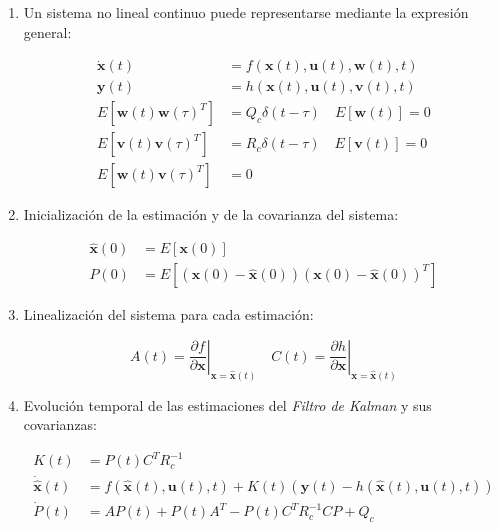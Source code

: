 \begin{enumerate}

\item Un sistema no lineal continuo puede representarse mediante la expresión general:

\begin{equation}
\begin{split}
	\boldsymbol{\dot{x}}(t) &= f(\boldsymbol{x}(t),\boldsymbol{u}(t),\boldsymbol{w}(t),t) \\
	\boldsymbol{y}(t) &= h(\boldsymbol{x}(t),\boldsymbol{u}(t),\boldsymbol{v}(t),t) \\
	E[\boldsymbol{w}(t)\boldsymbol{w}(\tau)^T] &= Q_c \delta(t-\tau) \quad E[\boldsymbol{w}(t)] = 0 \\
	E[\boldsymbol{v}(t)\boldsymbol{v}(\tau)^T] &= R_c \delta(t-\tau) \quad E[\boldsymbol{v}(t)] = 0 \\
	E[\boldsymbol{w}(t)\boldsymbol{v}(\tau)^T] &= 0
\end{split}
\end{equation}

\item Inicialización de la estimación y de la covarianza del sistema: 

\begin{equation}
\begin{split}
	\boldsymbol{\hat{x}}(0) &= E[\boldsymbol{x}(0)] \\
	P(0) &= E[(\boldsymbol{x}(0) - \boldsymbol{\hat{x}}(0)) (\boldsymbol{x}(0) - \boldsymbol{\hat{x}}(0))^T]
\end{split}
\end{equation}

\item Linealización del sistema para cada estimación:

\begin{equation}
	A(t) = \left.\frac{\partial f}{\partial\boldsymbol{x}} \right|_{\boldsymbol{x} = \boldsymbol{\hat{x}}(t)} \quad
	C(t) = \left.\frac{\partial h}{\partial\boldsymbol{x}} \right|_{\boldsymbol{x} = \boldsymbol{\hat{x}}(t)}
\end{equation}

\item Evolución temporal de las estimaciones del \emph{Filtro de Kalman} y sus covarianzas: 

\begin{equation}
\begin{split}
	K(t) &= P(t)C^T R_c^{-1} \\
	\boldsymbol{\dot{\hat{x}}}(t) &= f(\boldsymbol{\hat{x}}(t),\boldsymbol{u}(t),t) + K(t)(\boldsymbol{y}(t) - h(\boldsymbol{\hat{x}}(t),\boldsymbol{u}(t),t)) \\
	\dot{P}(t) &= AP(t) + P(t)A^T - P(t)C^TR_c^{-1}CP + Q_c
\end{split}
\end{equation}

\end{enumerate}


